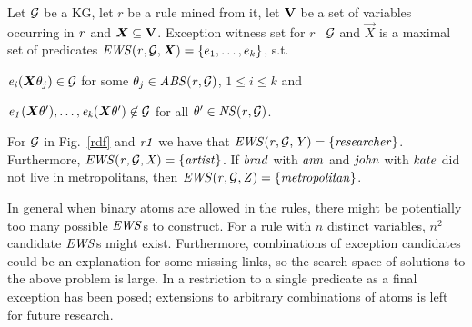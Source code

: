 \begin{definition} \label{def:ews}
Let $\mathcal{G}$ be a KG, let $r$ be a rule mined from it, let ${\mathbf V}$ be a set of variables occurring in $\mathit{r}$ and $\vec{X}\subseteq \cV$. Exception witness set for $r$ \wrt\ $\mathcal{G}$ and $\vec{X}$ is a maximal set of predicates $\mi{EWS(r,\cG,\vec{X})}=\{e_1,\dotsc,e_k\}$, s.t.
\begin{myitemize}
\item $\mi{e_i}(\vec{X}\theta_j)\in \cG$ for some $\theta_j\in \mathit{ABS(r,\mathcal{G})}$, $1 \leq i\leq k$ and
\item $\mi{e_1}(\vec{X}\theta'),\dotsc,\mi{e_k}(\vec{X}\theta')\not \in \cG$ for all $\theta' \in \mathit{NS(r,\mathcal{G})}$.
\end{myitemize}
\end{definition}

\begin{example}
For $\mathcal{G}$ in Fig.~\ref{rdf} and $\mathit{r1}$ 
we have that $\mathit{EWS(r,\mathcal{G},Y)}=\{\mathit{researcher}\}$. Furthermore,
 $\mathit{EWS(r,\mathcal{G},X)}=\{\mathit{artist}\}$. If $\mathit{brad}$ with $\mathit{ann}$ and $\mathit{john}$ with $\mathit{kate}$ did not live in %
metropolitans, then $\mathit{EWS(r,\mathcal{G},Z)}=\{\mathit{metropolitan}\}$. 
\end{example}
In general when binary atoms are allowed in the rules, there might be potentially too many possible $\mathit{EWS}$s to construct. 
For a rule with $n$ distinct variables, $n^2$ candidate $\mathit{EWS}$s might exist. Furthermore, combinations of exception candidates could be an explanation for some missing links, so the search space of solutions to the above problem is large. In \cite{rumis} a restriction to a single predicate as a final exception has been posed; extensions to arbitrary combinations of atoms is left for future research.





